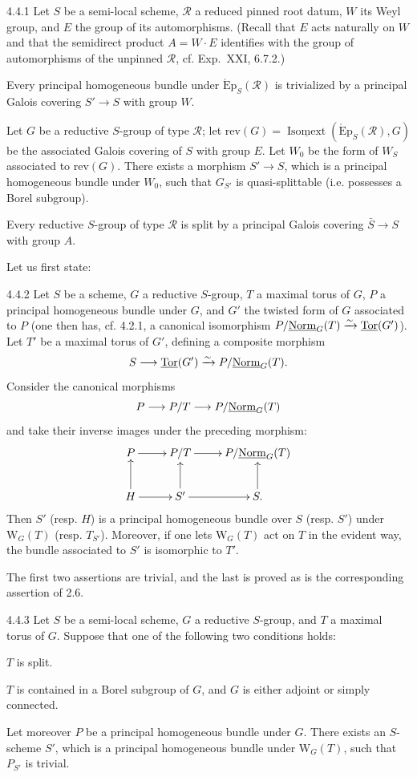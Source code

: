 \begin{theorem}{4.4.1}\label{XXIV.4.4.1}
Let $S$ be a semi-local scheme, $\mathscr R$ a reduced pinned root datum, $W$ its Weyl group, and $E$ the group of its automorphisms. (Recall that $E$ acts naturally on $W$ and that the semidirect product $A=W\cdot E$ identifies with the group of automorphisms of the unpinned $\mathscr R$, cf. Exp.~XXI, 6.7.2.)
\begin{enumeratei}
\item Every principal homogeneous bundle under $\operatorname{\acute Ep}_S(\mathscr R)$ is trivialized by a principal Galois covering $S'\to S$ with group $W$.
\item Let $G$ be a reductive $S$-group of type $\mathscr R$; let $\mathrm{rev}(G)=\underline{\operatorname{Isomext}}(\operatorname{\acute Ep}_S(\mathscr R),G)$ be the associated Galois covering of $S$ with group $E$. Let $W_0$ be the form of $W_S$ associated to $\mathrm{rev}(G)$. There exists a morphism $S'\to S$, which is a principal homogeneous bundle under $W_0$, such that $G_{S'}$ is quasi-splittable (i.e. possesses a Borel subgroup).
\item Every reductive $S$-group of type $\mathscr R$ is split by a principal Galois covering $\bar S\to S$ with group $A$.
\end{enumeratei}
\end{theorem}
Let us first state:
\begin{proposition}{4.4.2}\label{XXIV.4.4.2}
Let $S$ be a scheme, $G$ a reductive $S$-group, $T$ a maximal torus of $G$, $P$ a principal homogeneous bundle under $G$, and $G'$ the twisted form of $G$ associated to $P$ (one then has, cf. 4.2.1, a canonical isomorphism $P/\underline{\mathrm{Norm}}_G(T)\xrightarrow{\sim}\underline{\operatorname{Tor}}(G')$). Let $T'$ be a maximal torus of $G'$, defining a composite morphism
\[
S\longrightarrow\underline{\operatorname{Tor}}(G')\xrightarrow{\sim} P/\underline{\mathrm{Norm}}_G(T).
\]
Consider the canonical morphisms
\[
P\longrightarrow P/T\longrightarrow P/\underline{\mathrm{Norm}}_G(T)
\]
and take their inverse images under the preceding morphism:
\[
\xymatrix{P\ar[r]&P/T\ar[r]&P/\uNorm_G(T)\\
H\ar[u]\ar[r]&S'\ar[u]\ar[r]&S.\ar[u]}
\]
Then $S'$ (resp. $H$) is a principal homogeneous bundle over $S$ (resp. $S'$) under $\mathrm W_G(T)$ (resp. $T_{S'}$). Moreover, if one lets $\mathrm W_G(T)$ act on $T$ in the evident way, the bundle associated to $S'$ is isomorphic to $T'$.
\end{proposition}
The first two assertions are trivial, and the last is proved as is the corresponding assertion of 2.6.
\begin{corollary}{4.4.3}\label{XXIV.4.4.3}
Let $S$ be a semi-local scheme, $G$ a reductive $S$-group, and $T$ a maximal torus of $G$. Suppose that one of the following two conditions holds:
\begin{enumeratei}
\item $T$ is split.
\item $T$ is contained in a Borel subgroup of $G$, and $G$ is either adjoint or simply connected.
\end{enumeratei}
Let moreover $P$ be a principal homogeneous bundle under $G$. There exists an $S$-scheme $S'$, which is a principal homogeneous bundle under $\mathrm W_G(T)$, such that $P_{S'}$ is trivial.
\end{corollary}
